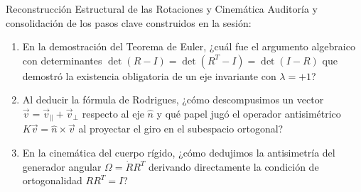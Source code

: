 \documentclass[10pt,aspectratio=169]{beamer}
\begin{document}
\begin{frame}{Reconstrucción Estructural de las Rotaciones y Cinemática}
  \vspace{0.15cm}
  Auditoría y consolidación de los pasos clave construidos en la sesión:
  \vspace{0.3cm}
  \begin{enumerate}\itemsep14pt
    \item En la demostración del Teorema de Euler, ¿cuál fue el argumento algebraico con determinantes $\det(R - I) = \det(R^T - I) = \det(I - R)$ que demostró la existencia obligatoria de un eje invariante con $\lambda = +1$?
    \item Al deducir la fórmula de Rodrigues, ¿cómo descompusimos un vector $\vec{v} = \vec{v}_\parallel + \vec{v}_\perp$ respecto al eje $\hat{n}$ y qué papel jugó el operador antisimétrico $K\vec{v} = \hat{n}\times\vec{v}$ al proyectar el giro en el subespacio ortogonal?
    \item En la cinemática del cuerpo rígido, ¿cómo dedujimos la antisimetría del generador angular $\Omega = \dot{R}R^T$ derivando directamente la condición de ortogonalidad $R R^T = I$?
  \end{enumerate}
\end{frame}
\end{document}

